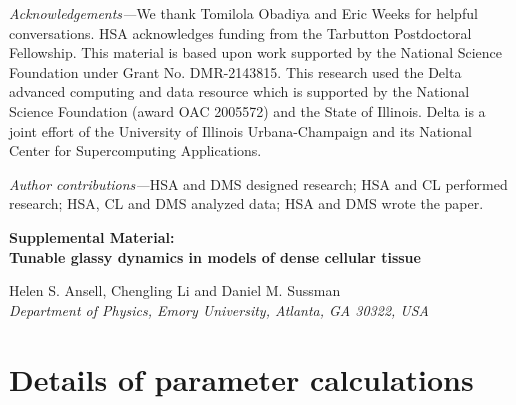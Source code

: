 \documentclass[amsmath,amssymb,prl,reprint,twocolumn]{revtex4-2}
\begin{document}
\emph{Acknowledgements---}We thank Tomilola Obadiya and Eric Weeks for helpful conversations.
HSA acknowledges funding from the Tarbutton Postdoctoral Fellowship.
This material is based upon work supported by the National Science Foundation under Grant No. DMR-2143815.
This research used the Delta advanced computing and data resource which is supported by the National Science Foundation (award OAC 2005572) and the State of Illinois. Delta is a joint effort of the University of Illinois Urbana-Champaign and its National Center for Supercomputing Applications.

\emph{Author contributions---}HSA and DMS designed research;
HSA and CL performed research;
HSA, CL and DMS analyzed data;
HSA and DMS wrote the paper.





\clearpage
\onecolumngrid


\let\oldthefigure\thefigure

\renewcommand{\thefigure}{S\arabic{figure}}
\makeatletter
\renewcommand{\fnum@figure}{FIG. \thefigure}
\makeatother



\setcounter{figure}{0}
\setcounter{page}{1}


\pagestyle{fancy}
\fancyhf{}
\fancyfoot[C]{\thepage}
\renewcommand{\headrulewidth}{0pt}
\renewcommand{\footrulewidth}{0pt}



\begin{center}
  {\large\bfseries
  Supplemental Material: \\Tunable glassy dynamics in models of dense cellular tissue}
  
  \vspace{0.5cm}
  
  Helen S. Ansell, Chengling Li and Daniel M. Sussman\\
  \itshape{Department of Physics, Emory University, Atlanta, GA 30322, USA}
 \end{center}



\section{Details of parameter calculations}
\end{document}
